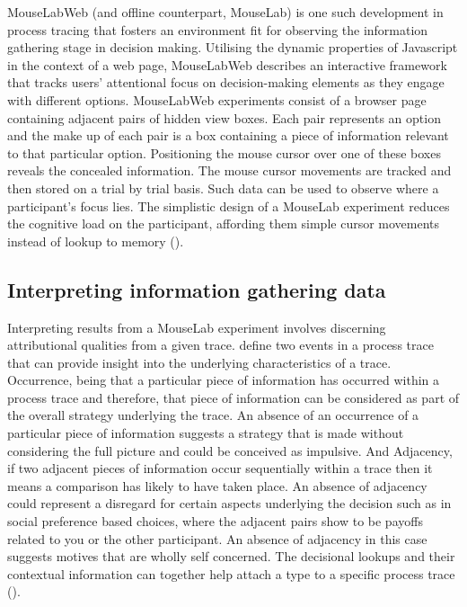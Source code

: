 \documentclass[man, floatsintext]{apa7}
\begin{document}
MouseLabWeb (and offline counterpart, MouseLab) is one such development in process tracing that fosters an environment fit for observing the information gathering stage in decision making. Utilising the dynamic properties of Javascript in the context of a web page, MouseLabWeb describes an interactive framework that tracks users' attentional focus on decision-making elements as they engage with different options. MouseLabWeb experiments consist of a browser page containing adjacent pairs of hidden view boxes. Each pair represents an option and the make up of each pair is a  box containing a piece of information relevant to that particular option. Positioning the mouse cursor over one of these boxes reveals the concealed information. The mouse cursor movements are tracked and then stored on a trial by trial basis. Such data can be used to observe where a participant's focus lies. The simplistic design of a MouseLab experiment reduces the cognitive load on the participant, affording them simple cursor movements instead of lookup to memory (\cite{MouselabWEBa}). 

\subsection{Interpreting information gathering data}

Interpreting results from a MouseLab experiment involves discerning attributional qualities from a given trace. \citeauthor{costa-gomesCognitionBehaviorNormalForm2001} define two events in a process trace that can provide insight into the underlying characteristics of a trace. Occurrence, being that a particular piece of information has occurred within a process trace and therefore, that piece of information can be considered as part of the overall strategy underlying the trace. An absence of an occurrence of a particular piece of information suggests a strategy that is made without considering the full picture and could be conceived as impulsive. And Adjacency, if two adjacent pieces of information occur sequentially within a trace then it means a comparison has likely to have taken place. An absence of adjacency could represent a disregard for certain aspects underlying the decision such as in social preference based choices, where the adjacent pairs show to be payoffs related to you or the other participant. An absence of adjacency in this case suggests motives that are wholly self concerned. The decisional lookups and their contextual information can together help attach a type to a specific process trace (\cite{costa-gomesCognitionBehaviorNormalForm2001}).
\end{document}
